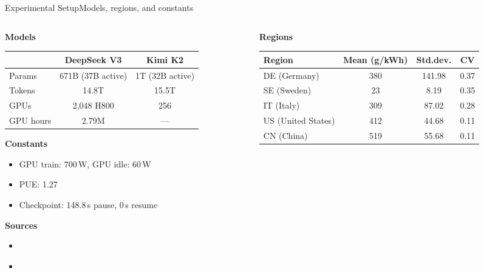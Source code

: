 \begin{frame}[t]{Experimental Setup}{Models, regions, and constants}

  \small
  \begin{columns}[T]
    \begin{column}{0.48\textwidth}
      \textbf{Models}
      \vspace{0.1cm}
      \begin{tabular}{l|c|c}
        \toprule
        & \textbf{DeepSeek V3} & \textbf{Kimi K2} \\
        \midrule
        Params & 671B (37B active) & 1T (32B active) \\
        Tokens & 14.8T & 15.5T \\
        GPUs & 2,048 H800 & 256 \\
        GPU hours & 2.79M & --- \\
        \bottomrule
      \end{tabular}

      \vspace{0.3cm}
      \textbf{Constants}
      \begin{itemize}
        \item GPU train: 700\,W, GPU idle: 60\,W
        \item PUE: 1.27
        \item Checkpoint: 148.8\,s pause, 0\,s resume
      \end{itemize}
      \vspace{0.3cm}
      \textbf{Sources}
      \begin{itemize}
        \item \textcite{kimi_team_kimi_2025}
        \item \textcite{deepseek-ai_deepseek-v3_2024}
      \end{itemize}
    \end{column}
    \begin{column}{0.48\textwidth}
      \textbf{Regions}
      \vspace{0.1cm}
      \begin{tabular}{l|c|c|c}
        \toprule
        Region & Mean (g/kWh) & Std.dev. & CV \\
        \midrule
        DE (Germany) & 380 & 141.98 & 0.37 \\
        SE (Sweden)  &  23 &   8.19 & 0.35 \\
        IT (Italy)   & 309 &  87.02 & 0.28 \\
        US (United States) & 412 & 44.68 & 0.11 \\
        CN (China)   & 519 &  55.68 & 0.11 \\
        \bottomrule
      \end{tabular}


\end{column}
\end{columns}
\end{frame}
